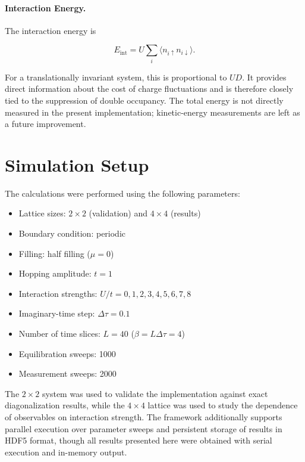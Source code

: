 \documentclass[9pt,a4paper,twocolumn,twoside]{rho-class/rho}
\begin{document}
\paragraph{Interaction Energy.}

The interaction energy is

\begin{equation}
E_{\mathrm{int}} = U\sum_i \langle n_{i\uparrow}n_{i\downarrow}\rangle.
\end{equation}

For a translationally invariant system, this is proportional to $UD$. It provides direct information about the cost of charge fluctuations and is therefore closely tied to the suppression of double occupancy. The total energy is not directly measured in the present implementation; kinetic-energy measurements are left as a future improvement.

\section{Simulation Setup}
The calculations were performed using the following parameters:

\begin{itemize}
\item Lattice sizes: $2\times2$ (validation) and $4\times4$ (results)
\item Boundary condition: periodic
\item Filling: half filling ($\mu = 0$)
\item Hopping amplitude: $t=1$
\item Interaction strengths: $U/t = 0,1,2,3,4,5,6,7,8$
\item Imaginary-time step: $\Delta\tau=0.1$
\item Number of time slices: $L=40$ ($\beta = L\Delta\tau = 4$)
\item Equilibration sweeps: 1000
\item Measurement sweeps: 2000
\end{itemize}

The $2\times2$ system was used to validate the implementation against exact diagonalization results, while the $4\times4$ lattice was used to study the dependence of observables on interaction strength. The framework additionally supports parallel execution over parameter sweeps and persistent storage of results in HDF5 format, though all results presented here were obtained with serial execution and in-memory output.
\end{document}
